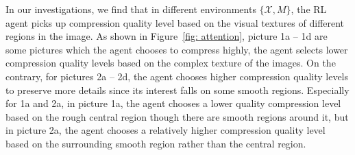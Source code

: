In our investigations, we find that in different environments $ \{\mathcal{X}, M\} $, the RL agent picks up compression quality level based on the visual textures of different regions in the image. As shown in Figure~\ref{fig: attention}, picture 1a -- 1d are some pictures which the agent chooses to compress highly, the agent selects lower compression quality levels based on the complex texture of the images. On the contrary, for pictures 2a -- 2d, the agent chooses higher compression quality levels to preserve more details since its interest falls on some smooth regions. Especially for 1a and 2a, in picture 1a, the agent chooses a lower quality compression level based on the rough central region though there are smooth regions around it, but in picture 2a, the agent chooses a relatively higher compression quality level based on the surrounding smooth region rather than the central region. %
